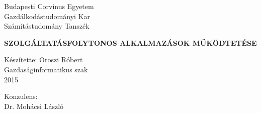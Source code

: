 \begin{raggedright}
Budapesti Corvinus Egyetem \\
Gazdálkodástudományi Kar \\
{\small Számítástudomány Tanszék}
\end{raggedright}

\thispagestyle{empty}

\vspace{3.5cm}

\vspace{0.8cm}
\begin{center}
\textbf{\Large SZOLGÁLTATÁSFOLYTONOS ALKALMAZÁSOK MŰKÖDTETÉSE}
\end{center}

\vfill
\begin{raggedleft}
Készítette: Oroszi Róbert\\
Gazdaságinformatikus szak\\
2015\\
\end{raggedleft}
\begin{raggedright}
{\Large Konzulens:}\\ Dr. Mohácsi László
\end{raggedright}
\vspace{0.6cm}


\clearpage












